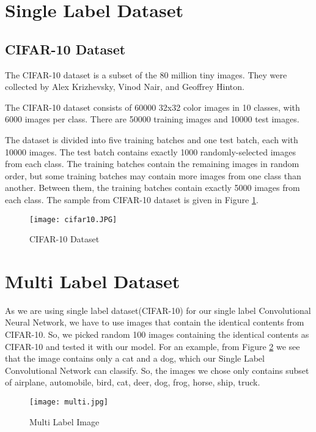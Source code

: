 \section{Single Label Dataset}
\subsection{CIFAR-10 Dataset}

The CIFAR-10 dataset is a subset of the 80 million tiny images. They were collected by Alex Krizhevsky, Vinod Nair, and Geoffrey Hinton.\hfill \break 

The CIFAR-10 dataset consists of 60000 32x32 color images in 10 classes, with 6000 images per class. There are 50000 training images and 10000 test images. \hfill \break

The dataset is divided into five training batches and one test batch, each with 10000 images. The test batch contains exactly 1000 randomly-selected images from each class. The training batches contain the remaining images in random order, but some training batches may contain more images from one class than another. Between them, the training batches contain exactly 5000 images from each class. The sample from CIFAR-10 dataset is given in Figure \ref{cifar10}.

\begin{figure}[h!]
  \centering
  \texttt{[image: cifar10.JPG]}
  \caption{CIFAR-10 Dataset} \label{cifar10}
\end{figure}

\section{Multi Label Dataset}
As we are using single label dataset(CIFAR-10) for our single label Convolutional Neural Network, we have to use images that contain the identical contents from CIFAR-10. So, we picked random 100 images containing the identical contents as CIFAR-10 and tested it with our model. For an example, from Figure \ref{multi} we see that the image contains only a cat and a  dog, which our Single Label Convolutional Network can classify. So, the images we chose only contains subset of airplane, automobile, bird, cat, deer, dog, frog, horse, ship, truck.  

\begin{figure}[h!]
  \centering
  \texttt{[image: multi.jpg]}
  \caption{Multi Label Image} \label{multi}
\end{figure}